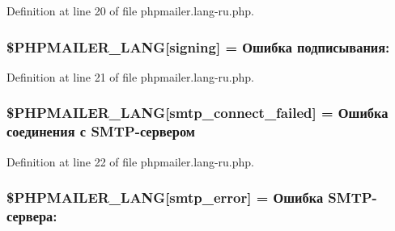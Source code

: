 Definition at line 20 of file phpmailer.\+lang-\/ru.\+php.

\subsubsection[{\texorpdfstring{\$\+P\+H\+P\+M\+A\+I\+L\+E\+R\+\_\+\+L\+A\+NG}{$PHPMAILER_LANG}}]{\setlength{\rightskip}{0pt plus 5cm}\$P\+H\+P\+M\+A\+I\+L\+E\+R\+\_\+\+L\+A\+NG\mbox{[}\textquotesingle{}signing\textquotesingle{}\mbox{]} = \textquotesingle{}Ошибка подписывания\+: \textquotesingle{}}\hypertarget{phpmailer_8lang-ru_8php_a68e437bdb9b968a5a67320f03d231565}{}\label{phpmailer_8lang-ru_8php_a68e437bdb9b968a5a67320f03d231565}


Definition at line 21 of file phpmailer.\+lang-\/ru.\+php.

\subsubsection[{\texorpdfstring{\$\+P\+H\+P\+M\+A\+I\+L\+E\+R\+\_\+\+L\+A\+NG}{$PHPMAILER_LANG}}]{\setlength{\rightskip}{0pt plus 5cm}\$P\+H\+P\+M\+A\+I\+L\+E\+R\+\_\+\+L\+A\+NG\mbox{[}\textquotesingle{}smtp\+\_\+connect\+\_\+failed\textquotesingle{}\mbox{]} = \textquotesingle{}Ошибка соединения с {\bf S\+M\+TP}-\/сервером\textquotesingle{}}\hypertarget{phpmailer_8lang-ru_8php_a7b321d4ca1e9df702403ed4c61aa0980}{}\label{phpmailer_8lang-ru_8php_a7b321d4ca1e9df702403ed4c61aa0980}


Definition at line 22 of file phpmailer.\+lang-\/ru.\+php.

\subsubsection[{\texorpdfstring{\$\+P\+H\+P\+M\+A\+I\+L\+E\+R\+\_\+\+L\+A\+NG}{$PHPMAILER_LANG}}]{\setlength{\rightskip}{0pt plus 5cm}\$P\+H\+P\+M\+A\+I\+L\+E\+R\+\_\+\+L\+A\+NG\mbox{[}\textquotesingle{}smtp\+\_\+error\textquotesingle{}\mbox{]} = \textquotesingle{}Ошибка {\bf S\+M\+TP}-\/сервера\+: \textquotesingle{}}\hypertarget{phpmailer_8lang-ru_8php_a7d9cffba1e669c845f8a4c891ee50064}{}\label{phpmailer_8lang-ru_8php_a7d9cffba1e669c845f8a4c891ee50064}


